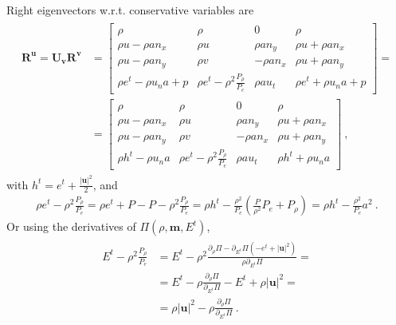 \documentclass[letterpaper,10pt,english]{jupyterBook}
\begin{document}
\sphinxAtStartPar
Right eigenvectors w.r.t. conservative variables are
\begin{equation*}
\begin{split}\begin{aligned}
\mathbf{R}^\mathbf{u} = \mathbf{U}_{\mathbf{v}} \mathbf{R}^{\mathbf{v}} 
& =
\begin{bmatrix}
  \rho & \rho & 0 & \rho \\
  \rho u - \rho a n_x & \rho u & \rho a n_y & \rho u + \rho a n_x \\
  \rho u - \rho a n_y & \rho v &-\rho a n_x & \rho u + \rho a n_y \\
  \rho e^t - \rho u_n a + p & \rho e^t - \rho^2 \frac{P_\rho}{P_e} & \rho a u_t & \rho e^t + \rho u_n a + p 
\end{bmatrix} = \\
& =
\begin{bmatrix}
  \rho & \rho & 0 & \rho \\
  \rho u - \rho a n_x & \rho u & \rho a n_y & \rho u + \rho a n_x \\
  \rho u - \rho a n_y & \rho v &-\rho a n_x & \rho u + \rho a n_y \\
  \rho h^t - \rho u_n a & \rho e^t - \rho^2 \frac{P_\rho}{P_e} & \rho a u_t & \rho h^t + \rho u_n a
\end{bmatrix} \ ,
\end{aligned}\end{split}
\end{equation*}
\sphinxAtStartPar
with \(h^t = e^t + \frac{|\mathbf{u}|^2}{2}\), and
\begin{equation*}
\begin{split}\rho e^t - \rho^2 \frac{P_\rho}{P_e} = \rho e^t + P - P - \rho^2 \frac{P_\rho}{P_e} = \rho h^t - \frac{\rho^2}{P_e} \left( \frac{P}{\rho^2} P_e + P_\rho \right) = \rho h^t - \frac{\rho^2}{P_e} a^2 \ .\end{split}
\end{equation*}
\sphinxAtStartPar
Or using the derivatives of \(\Pi(\rho, \mathbf{m}, E^t)\),
\begin{equation*}
\begin{split}\begin{aligned}
  E^t - \rho^2 \frac{P_\rho}{P_e} 
  & = E^t - \rho^2 \frac{\partial_\rho \Pi - \partial_{E^t} \Pi (-e^t + |\mathbf{u}|^2)}{\rho \partial_{E^t} \Pi } = \\
  & = E^t - \rho \frac{\partial_\rho \Pi}{\partial_{E^t} \Pi} - E^t + \rho |\mathbf{u}|^2 = \\
  & = \rho |\mathbf{u}|^2 - \rho \frac{\partial_\rho \Pi}{\partial_{E^t} \Pi} \ .
\end{aligned}\end{split}
\end{equation*}
\end{document}
